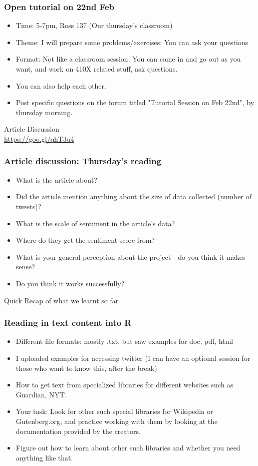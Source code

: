 \documentclass{beamer}
\begin{document}
\begin{frame}
\frametitle{Open tutorial on 22nd Feb}
\begin{itemize}
\item Time: 5-7pm, Ross 137 (Our thursday's classroom)
\item Theme: I will prepare some problems/exercises; You can ask your questions
\item Format: Not like a classroom session. You can come in and go out as you want, and work on 410X related stuff, ask questions. 
\item You can also help each other.
\item Post specific questions on the forum titled "Tutorial Session on Feb 22nd", by thursday morning.
\end{itemize}
\end{frame}

\begin{frame}
\Large Article Discussion
\\ \url{https://goo.gl/qhT3u4}
\end{frame}

\begin{frame}
\frametitle{Article discussion: Thursday's reading}
\begin{itemize}
\item What is the article about? \pause 
\item Did the article mention anything about the size of data collected (number of tweets)? \pause
\item What is the scale of sentiment in the article's data? \pause
\item Where do they get the sentiment score from? \pause
\item What is your general perception about the project - do you think it makes sense? \pause
\item Do you think it works successfully? 
\end{itemize}
\end{frame}

\begin{frame}
\Large Quick Recap of what we learnt so far
\end{frame}

\begin{frame}
\frametitle{Reading in text content into R}
\begin{itemize}
\item Different file formats: mostly .txt, but saw examples for doc, pdf, html
\item I uploaded examples for accessing twitter (I can have an optional session for those who want to know this, after the break)
\item How to get text from specialized libraries for different websites such as Guardian, NYT. \pause
\item Your task: Look for other such special libraries for Wikipedia or Gutenberg.org, and practice working with them by looking at the documentation provided by the creators.
\item Figure out how to learn about other such libraries and whether you need anything like that.
\end{itemize}
\end{frame}
\end{document}
